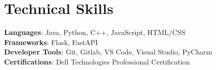 \documentclass[letterpaper,11pt]{article}
\begin{document}
\section{Technical Skills}
 \begin{itemize}[leftmargin=0.15in, label={}]
    \small{\item{
     \textbf{Languages}{: Java, Python, C++, JavaScript, HTML/CSS} \\
     \textbf{Frameworks}{: Flask, FastAPI} \\
     \textbf{Developer Tools}{: Git, Gitlab, VS Code, Visual Studio, PyCharm} \\
     \textbf{Certifications}{: Dell Technologies Professional Certification}
    }}
 \end{itemize}


\end{document}
